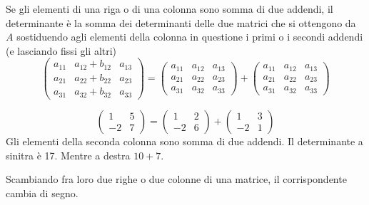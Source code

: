 \begin{pro}
  \label{pro:prodeldet4}
  Se gli elementi di una riga o di una colonna sono somma di due
  addendi, il determinante è la somma dei determinanti delle due matrici
  che si ottengono da $A$ sostiduendo agli elementi della colonna in
  questione i primi o i secondi addendi (e lasciando fissi gli altri)
  \begin{equation*}
    \begin{pmatrix}
      a_{11}& a_{12} + b_{12} & a_{13}\\
      a_{21}& a_{22} + b_{22} & a_{23}\\
      a_{31}& a_{32} + b_{32} & a_{33}
    \end{pmatrix}=
    \begin{pmatrix}
      a_{11} & a_{12} & a_{13}\\
      a_{21} & a_{22} & a_{23}\\
      a_{31} & a_{32} & a_{33}
    \end{pmatrix}
    +
    \begin{pmatrix}
      a_{11} & a_{12} & a_{13}\\
      a_{21} & a_{22} & a_{23}\\
      a_{31} & a_{32} & a_{33}
    \end{pmatrix}
  \end{equation*}
\end{pro}
\begin{es}
  \begin{equation*}
    \begin{pmatrix}
      1 & 5\\
      -2 & 7
    \end{pmatrix}=
    \begin{pmatrix}
      1 & 2\\
      -2 & 6
    \end{pmatrix}+
    \begin{pmatrix}
      1 & 3 \\
      -2 & 1
    \end{pmatrix}
  \end{equation*}
  Gli elementi della seconda colonna sono somma di due addendi. Il
  determinante a sinitra è 17. Mentre a destra $10+7$.
\end{es}
\begin{pro}
  \label{pro:prodeldet5}
  Scambiando fra loro due righe o due colonne di una matrice, il
  corrispondente cambia di segno.
\end{pro}
